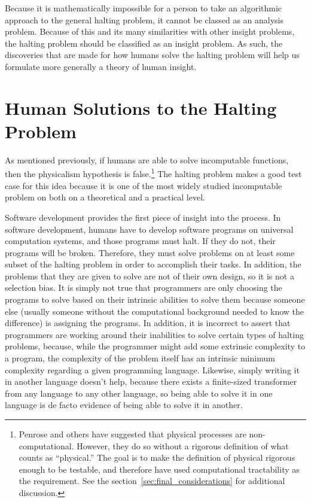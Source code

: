 Because it is mathematically impossible for a person to take an algorithmic approach to the general halting problem, it cannot be classed as an analysis problem.  Because of this and its many similarities with other insight problems, the halting problem should be classified as an insight problem.  As such, the discoveries that are made for how humans solve the halting problem will help us formulate more generally a theory of human insight.

\section{Human Solutions to the Halting Problem}

As mentioned previously, if humans are able to solve incomputable functions, then the physicalism hypothesis is false.\footnote{Penrose and others have suggested that physical processes are non-computational.  However, they do so without a rigorous definition of what counts as ``physical.''  The goal is to make the definition of physical rigorous enough to be testable, and therefore have used computational tractability as the requirement.  See the section~\ref{sec:final_considerations} for additional discussion.}  The halting problem makes a good test case for this idea because it is one of the most widely studied incomputable problem on both on a theoretical and a practical level.

Software development provides the first piece of insight into the process. In software development, humans have to develop software programs on universal computation systems, and those programs must halt.  If they do not, their programs will be broken.  Therefore, they must solve problems on at least some subset of the halting problem in order to accomplish their tasks.  In addition, the problems that they are given to solve are not of their own design, so it is not a selection bias.  It is simply not true that programmers are only choosing the programs to solve based on their intrinsic abilities to solve them because someone else (usually someone without the computational background needed to know the difference) is assigning the programs.  In addition, it is incorrect to assert that programmers are working around their inabilities to solve certain types of halting problems, because, while the programmer might add some extrinsic complexity to a program, the complexity of the problem itself has an intrinsic minimum complexity regarding a given programming language.  Likewise, simply writing it in another language doesn't help, because there exists a finite-sized transformer from any language to any other language, so being able to solve it in one language is de facto evidence of being able to solve it in another.

